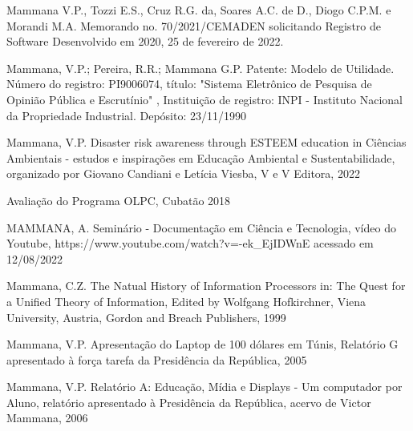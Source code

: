 \begin{flushleft}
[MAMMANA et al., 2022] Mammana V.P., Tozzi E.S., Cruz R.G. da, Soares A.C. de D., Diogo C.P.M. e Morandi M.A. Memorando no. 70/2021/CEMADEN solicitando Registro de Software Desenvolvido em 2020, 25 de fevereiro de 2022.
\end{flushleft}


\begin{flushleft}
[MAMMANA et al., 1990] Mammana, V.P.; Pereira, R.R.; Mammana G.P. Patente: Modelo de Utilidade. Número do registro: PI9006074, título: "Sistema Eletrônico de Pesquisa de Opinião Pública e Escrutínio" , Instituição de registro: INPI - Instituto Nacional da Propriedade Industrial. Depósito: 23/11/1990
\end{flushleft}


\begin{flushleft}
[MAMMANA et al., 2022a] Mammana, V.P. Disaster risk awareness through ESTEEM education in Ciências Ambientais - estudos e inspirações em Educação Ambiental e Sustentabilidade, organizado por Giovano Candiani e Letícia Viesba, V e V Editora, 2022
\end{flushleft}


\begin{flushleft}
 Avaliação do Programa OLPC, Cubatão 2018
\end{flushleft}


\begin{flushleft}
[MAMMANA, 2020] MAMMANA, A. Seminário - Documentação em Ciência e Tecnologia, vídeo do Youtube, https://www.youtube.com/watch?v=-ek\_EjIDWnE acessado em 12/08/2022
\end{flushleft}


\begin{flushleft}
[MAMMANA, 1999] Mammana, C.Z. The Natual History of Information Processors in: The Quest for a Unified Theory of Information, Edited by Wolfgang Hofkirchner, Viena University, Austria, Gordon and Breach Publishers, 1999
\end{flushleft}


\begin{flushleft}
[MAMMANA, 2005] Mammana, V.P. Apresentação do Laptop de 100 dólares em Túnis, Relatório G apresentado à força tarefa da Presidência da República, 2005
\end{flushleft}


\begin{flushleft}
[MAMMANA, 2006] Mammana, V.P. Relatório A: Educação, Mídia e Displays - Um computador por Aluno, relatório apresentado à Presidência da República, acervo de Victor Mammana, 2006
\end{flushleft}


